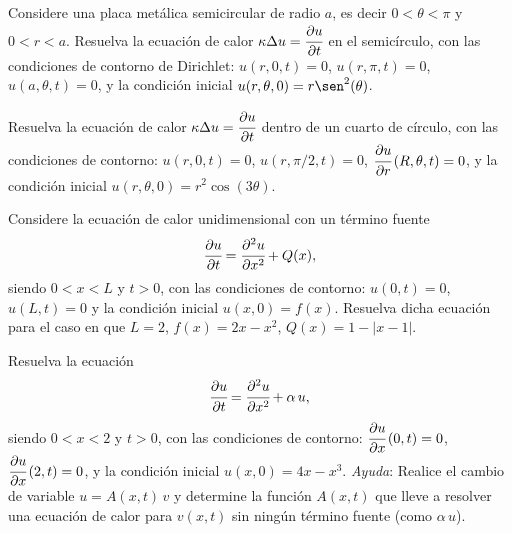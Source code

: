 \documentclass[11pt,spanish]{article}
\begin{document}
\prob{} Considere una placa metálica semicircular de radio $a$, es decir $0 < \theta < \pi$ y $0 < r < a$. Resuelva la ecuación de calor $\kappa \Delta u= \cfrac{\partial u}{\partial t}$ en el semicírculo, con las condiciones de contorno de Dirichlet:
$u(r,0,t) = 0$, $u(r,\pi,t) = 0$, $u(a,\theta,t) = 0$, y la condición inicial $u(r,\theta,0) = r \sen^2(\theta)$.

\prob{} Resuelva la ecuación de calor $\kappa \Delta u= \cfrac{\partial u}{\partial t}$ dentro de un cuarto de círculo, con las condiciones de contorno: $u(r,0,t) = 0$, $u(r,\pi/2,t) = 0$, $\cfrac{\partial u}{\partial r}\,(R,\theta,t) = 0$, y la condición inicial $u(r,\theta,0) = r^2 \cos(3\theta)$.

\prob{} Considere la ecuación de calor unidimensional con un término fuente
\[\cfrac{\partial u}{\partial t} = \cfrac{\partial^2 u}{\partial x^2} + Q(x),\]
siendo $0 < x < L$ y $t > 0$, con las condiciones de contorno: $u(0,t) = 0$, $u(L,t) = 0$ y la condición inicial $u(x,0) = f(x)$. Resuelva dicha ecuación para el caso en que $L = 2$, $f(x) = 2x-x^2$, $Q(x) = 1 - |x-1|$.

\prob{} Resuelva la ecuación
\[\cfrac{\partial u}{\partial t} = \cfrac{\partial^2 u}{\partial x^2} + \alpha\,u,\]
siendo $0 < x < 2$ y $t > 0$, con las condiciones de contorno: $\cfrac{\partial u}{\partial x}\,(0,t) = 0$, $\cfrac{\partial u}{\partial x}\,(2,t) = 0$, y la condición inicial $u(x,0) = 4x-x^3$.
\emph{Ayuda}: Realice el cambio de variable $u = A(x,t)\,v$ y determine la función $A(x,t)$ que lleve a resolver una ecuación de calor para $v(x,t)$ sin ningún término fuente (como $\alpha\,u$).
\end{document}
